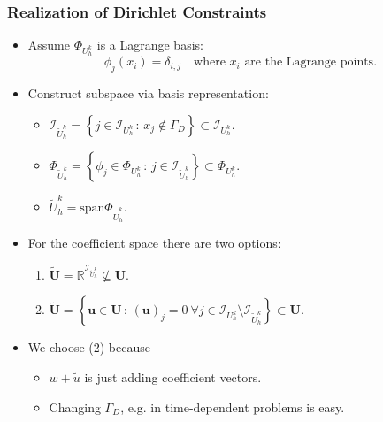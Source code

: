 \begin{frame}
\frametitle{Realization of Dirichlet Constraints}
\begin{itemize}
\item Assume $\Phi_{U_h^k}$ is a Lagrange basis:
\begin{equation*}
\phi_j(x_i)=\delta_{i,j} \quad\text{where $x_i$ are the Lagrange points}.
\end{equation*}
\item Construct subspace via basis representation:
\begin{itemize}
\item $\mathcal{I}_{\tilde{U}_h^k} = \left\{ j\in \mathcal{I}_{U_h^k} \,:\,
x_j \not\in \Gamma_D \right\} \subset \mathcal{I}_{U_h^k}$.
\item $\Phi_{\tilde{U}_h^k} = \left\{ \phi_j\in \Phi_{U_h^k} \,:\,
j \in \mathcal{I}_{\tilde{U}_h^k} \right\} \subset \Phi_{U_h^k}$.
\item $\tilde{U}_h^k = \text{span}\Phi_{\tilde{U}_h^k}$.
\end{itemize}
\item For the coefficient space there are two options:
\begin{enumerate}
\item $\tilde{\mathbf{U}} = \mathbb{R}^{\mathcal{I}_{\tilde{U}_h^k}} \not\subseteq \mathbf{U}$.
\item $\tilde{\mathbf{U}} = \left\{ \mathbf{u}\in\mathbf{U} \,:\, (\mathbf{u})_j = 0 \  \forall
j \in \mathcal{I}_{U_h^k} \setminus \mathcal{I}_{\tilde{U}_h^k} \right\} \subset \mathbf{U}$.
\end{enumerate}
\item We choose (2) because
\begin{itemize}
\item $w + \tilde{u}$ is just adding coefficient vectors.
\item Changing $\Gamma_D$, e.g. in time-dependent problems is easy.
\end{itemize}
\end{itemize}
\end{frame}


